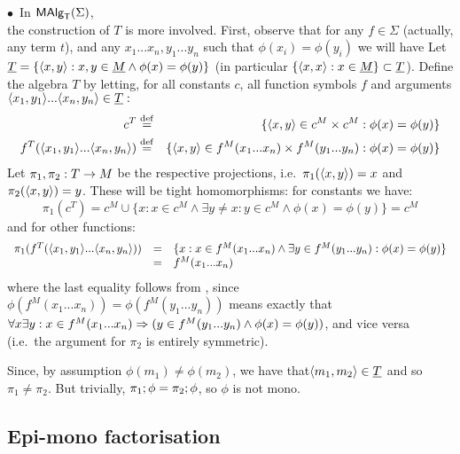 \documentclass[10pt]{article}
\begin{document}
\begin{Proof}
\begin{enumerate}
\begin{enumerate}
$\bullet$\ In $\mbox{\rm\sf MAlg}_{\sf T}(\Sigma)$, \\
the construction of $T$ is more involved. First, observe that for any
$f\in\Sigma$ (actually, any term $t$), and any $x_1...x_n, y_1...y_n$
such that $\phi(x_i)=\phi(y_i)$ we will have 
Let $\underline {T}=\{\langle x,y\rangle:x,y\in\underline {M}\land \phi(x)=\phi(y)\}$ (in
particular $\{\langle x,x\rangle:x\in\underline {M}\}\subset\underline {T}$). Define the
algebra $T$ by letting, for all constants $c$, all function symbols
$f$ and arguments $\langle x_1,y_1\rangle...\langle x_n,y_n\rangle\in\underline {T}:$
%
\begin{eqnarray*}
c^T & \stackrel{{\rm \tiny{def}}}= & \{\langle x,y\rangle\in c^M\times c^M : \phi(x)=\phi(y)\} \\
f^T(\langle x_1,y_1\rangle...\langle x_n,y_n\rangle) & \stackrel{{\rm \tiny{def}}}= & 
\{\langle x,y\rangle\in f^M(x_1...x_n)\times f^M(y_1...y_n):\phi(x)=\phi(y)\}
\end{eqnarray*}
%
Let $\pi_1,\pi_2:T\rightarrow M$ be the respective projections, i.e.\
$\pi_1(\langle x,y\rangle)=x$ and $\pi_2(\langle x,y\rangle)=y$. These will be tight
homomorphisms: for constants we have: 
\[
\pi_1(c^T)= c^M\cup \{x:x\in
c^M\land \exists y\not= x:y\in c^M\land \phi(x)=\phi(y)\}=c^M
\] 
and for other functions: 
\[
\begin{array}{lcl}
\pi_1(f^T(\langle x_1,y_1\rangle...\langle x_n,y_n\rangle)) 
& = &
\{x:x\in f^M(x_1...x_n)\land \exists y\in
f^M(y_1...y_n):\phi(x)=\phi(y)\} \\
& = & 
f^M(x_1...x_n)
\end{array}
\]
where the last equality follows from , since
$\phi(f^M(x_1...x_n))=\phi(f^M(y_1...y_n))$ means exactly that
$\forall x\exists y: x\in f^M(x_1...x_n)\Rightarrow (y\in f^M(y_1...y_n)
\land \phi(x)=\phi(y))$, and vice versa (i.e.\ the argument for
$\pi_2$ is entirely symmetric).

Since, by assumption $\phi(m_1)\not=\phi(m_2)$, we have
that$\langle m_1,m_2\rangle\in\underline {T}$ and so $\pi_1\not=\pi_2$. But trivially,
$\pi_1;\phi=\pi_2;\phi$, so $\phi$ is not mono.
\end{enumerate}
\end{enumerate}
\end{Proof}



\subsection{Epi-mono factorisation}
\end{document}
